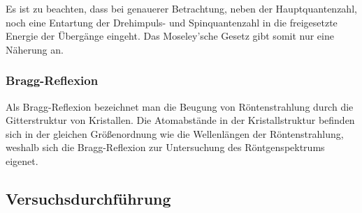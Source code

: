 Es ist zu beachten, dass bei genauerer Betrachtung, neben der Hauptquantenzahl, noch eine Entartung der Drehimpuls- und Spinquantenzahl in die freigesetzte Energie der Übergänge eingeht. Das Moseley'sche Gesetz gibt somit nur eine Näherung an.

\subsubsection*{Bragg-Reflexion}

Als Bragg-Reflexion bezeichnet man die Beugung von Röntenstrahlung durch die Gitterstruktur von Kristallen. Die Atomabstände in der Kristallstruktur befinden sich in der gleichen Größenordnung wie die Wellenlängen der Röntenstrahlung, weshalb sich die Bragg-Reflexion zur Untersuchung des Röntgenspektrums eigenet.



\subsection{Versuchsdurchführung}